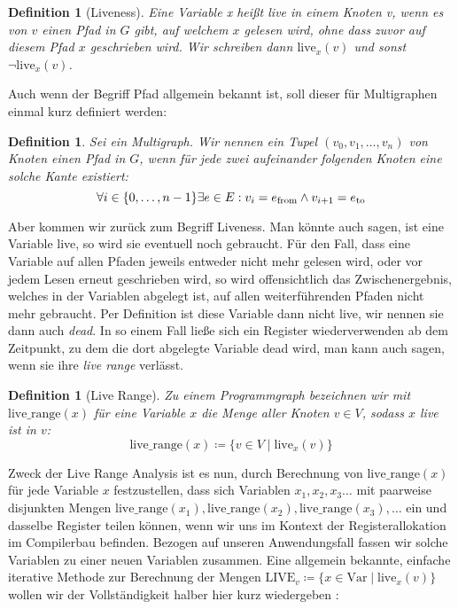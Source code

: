 \documentclass[a4paper]{article}
\newtheorem{definition}[satz]{Definition} %
\theoremstyle{nonumberplain}
\begin{document}
\begin{definition}[Liveness]
	Eine Variable \textit{x} heißt \textit{live} in einem Knoten \textit{v}, wenn es von $v$ einen Pfad in $G$ gibt, auf welchem $x$ gelesen wird, ohne dass zuvor auf diesem Pfad $x$ geschrieben wird. Wir schreiben dann $\textrm{live}_x(v)$ und sonst $\neg \textrm{live}_x(v)$.
\end{definition}

Auch wenn der Begriff Pfad allgemein bekannt ist, soll dieser für Multigraphen einmal kurz definiert werden:

\begin{definition}
	Sei \mgtup{} ein Multigraph. Wir nennen ein Tupel $(v_0,v_1, \dots, v_n)$ von Knoten einen Pfad in $G$, wenn für jede zwei aufeinander folgenden Knoten eine solche Kante existiert:
	\begin{equation*}
		\forall i \in \{0, \dots, n-1\} \exists e \in E : v_i = e_{\mathrm{from}} \land v_{i+1} = e_{\mathrm{to}}
	\end{equation*}
\end{definition}

Aber kommen wir zurück zum Begriff Liveness. Man könnte auch sagen, ist eine Variable live, so wird sie eventuell noch gebraucht. Für den Fall, dass eine Variable auf allen Pfaden jeweils entweder nicht mehr gelesen wird, oder vor jedem Lesen erneut geschrieben wird, so wird offensichtlich das Zwischenergebnis, welches in der Variablen abgelegt ist, auf allen weiterführenden Pfaden nicht mehr gebraucht. Per Definition ist diese Variable dann nicht live, wir nennen sie dann auch \textit{dead}. In so einem Fall ließe sich ein Register wiederverwenden ab dem Zeitpunkt, zu dem die dort abgelegte Variable dead wird, man kann auch sagen, wenn sie ihre \textit{live range} verlässt.

\begin{definition}[Live Range]
	Zu einem Programmgraph \mgtup{} bezeichnen wir mit $\textrm{live\_range}(x)$ für eine Variable $x$ die Menge aller Knoten $v\in V$, sodass $x$ live ist in $v$:
	\[
	\textrm{live\_range}(x) \coloneqq \{v\in V \mid \textrm{live}_x(v) \}
	\]
\end{definition}

Zweck der Live Range Analysis ist es nun, durch Berechnung von $\textrm{live\_range}(x)$ für jede Variable $x$ festzustellen, dass sich Variablen $x_1, x_2, x_3 \dots$ mit paarweise disjunkten Mengen $\textrm{live\_range}(x_1), \textrm{live\_range}(x_2), \textrm{live\_range}(x_3), \dots$ ein und dasselbe Register teilen können, wenn wir uns im Kontext der Registerallokation im Compilerbau befinden. Bezogen auf unseren Anwendungsfall fassen wir solche Variablen zu einer neuen Variablen zusammen.
Eine allgemein bekannte, einfache iterative Methode zur Berechnung der Mengen $\textrm{LIVE}_v \coloneqq \{ x \in \mathrm{Var} \mid \textrm{live}_x(v) \}$ wollen wir der Vollständigkeit halber hier kurz wiedergeben \cite{liveanalysis}:
\end{document}
